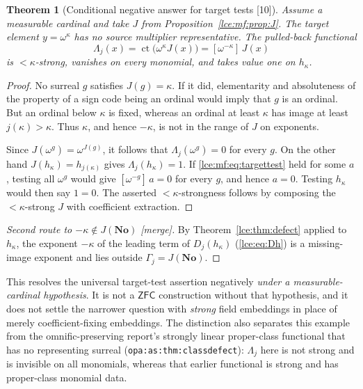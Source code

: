 \documentclass[11pt,letterpaper]{article}
\numberwithin{equation}{section}
\newtheorem{theorem}{Theorem}[section]
\theoremstyle{definition}
\theoremstyle{remark}
\newcommand{\No}{\mathbf{No}}
\newcommand{\ct}{\operatorname{ct}}
\newcommand{\Gam}{\Gamma_j}
\newcommand{\coef}[2]{[\omega^{#1}]\,#2}
\newcommand{\ZFC}{\mathsf{ZFC}}
\newcommand{\thref}[1]{Theorem~\ref{#1}}
\newcommand{\prref}[1]{Proposition~\ref{#1}}
\newcommand{\src}[1]{\textup{\textsf{\small[#1]}}}%
\newcommand{\mergetag}{\textup{\textsf{\small[merge]}}}%
\newcommand{\lbl}[1]{\nolinkurl{#1}}%
\begin{document}
\begin{theorem}[Conditional negative answer for target tests \src{10}]\label{lce:mf:thm:target}
Assume a measurable cardinal and take $J$ from \prref{lce:mf:prop:J}. The
target element $y=\omega^\kappa$ has no source multiplier representative.
The pulled-back functional
\[
 \Lambda_j(x)=\ct\bigl(\omega^\kappa J(x)\bigr)=\coef{-\kappa}{J(x)}
\]
is ${<}\kappa$-strong, vanishes on every monomial, and takes value one on
$h_\kappa$.
\end{theorem}
\begin{proof}
No surreal $g$ satisfies $J(g)=\kappa$. If it did, elementarity and
absoluteness of the property of a sign code being an ordinal would imply
that $g$ is an ordinal. But an ordinal below $\kappa$ is fixed, whereas an
ordinal at least $\kappa$ has image at least $j(\kappa)>\kappa$. Thus
$\kappa$, and hence $-\kappa$, is not in the range of $J$ on exponents.

Since $J(\omega^g)=\omega^{J(g)}$, it follows that $\Lambda_j(\omega^g)=0$
for every $g$. On the other hand $J(h_\kappa)=h_{j(\kappa)}$ gives
$\Lambda_j(h_\kappa)=1$. If \eqref{lce:mf:eq:targettest} held for some $a$,
testing all $\omega^g$ would give $\coef{-g}a=0$ for every $g$, and hence
$a=0$. Testing $h_\kappa$ would then say $1=0$. The asserted
${<}\kappa$-strongness follows by composing the ${<}\kappa$-strong $J$ with
coefficient extraction.
\end{proof}

\begin{proof}[Second route to $-\kappa\notin J(\No)$ \mergetag]
By \thref{lce:thm:defect} applied to $h_\kappa$, the exponent $-\kappa$ of
the leading term of $D_j(h_\kappa)$ (\eqref{lce:eq:Dh}) is a missing-image
exponent and lies outside $\Gam=J(\No)$.
\end{proof}

This resolves the universal target-test assertion negatively \emph{under a
measurable-cardinal hypothesis}. It is not a $\ZFC$ construction without that
hypothesis, and it does not settle the narrower question with \emph{strong}
field embeddings in place of merely coefficient-fixing embeddings. The
distinction also separates this example from the omnific-preserving report's
strongly linear proper-class functional that has no representing surreal
(\lbl{opa:as:thm:classdefect}): $\Lambda_j$ here is not strong and is
invisible on all monomials, whereas that earlier functional is strong and
has proper-class monomial data.
\end{document}
